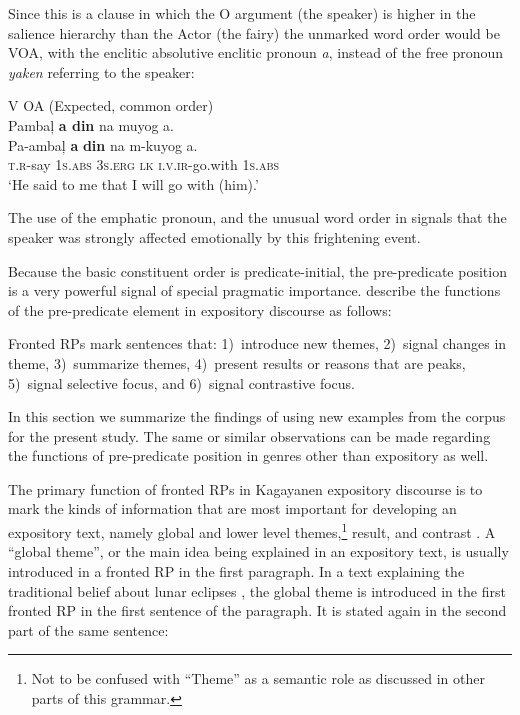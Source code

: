 \largerpage
Since this is a clause in which the O argument (the speaker) is higher in the salience hierarchy than the Actor (the fairy) the unmarked word order would be VOA, with the enclitic absolutive enclitic pronoun \textit{a}, instead of the free pronoun \textit{yaken} referring to the speaker:

\ea 
\hspace{.1cm}V\hspace{.7cm}   O\hspace{.2cm}A\hspace{.5cm} (Expected, common order) \\
Pambaļ  \textbf{a  din}  na  muyog  a.    \\\smallskip
\gll Pa-ambaļ  \textbf{a}  \textbf{din}  na  m-kuyog  a. \\
\textsc{t.r}-say  1\textsc{s.abs}  3\textsc{s.erg}  \textsc{lk}  \textsc{i.v.ir}-go.with  1\textsc{s.abs} \\
\glt ‘He said to me that I will go with (him).’
\z

The use of the emphatic pronoun, and the unusual word order in  signals that the speaker was strongly affected emotionally by this frightening event.

Because the basic constituent order is predicate-initial, the pre-predicate position is a very powerful signal of special pragmatic importance. \citet[89]{pebleyfunctions1999} describe the functions of the pre-predicate element in expository discourse as follows:

\begin{modquote}
Fronted RPs mark sentences that: 1)~introduce new themes, 2)~signal changes in theme, 3)~summarize themes, 4)~present results or reasons that are peaks, 5)~signal selective focus, and 6)~signal contrastive focus.
\end{modquote}

In this section we summarize the findings of \citet{pebleyfunctions1999} using new examples from the corpus for the present study. The same or similar observations can be made regarding the functions of pre-predicate position in genres other than expository as well.


The primary function of fronted RPs in Kagayanen expository discourse is to mark the kinds of information that are most important for developing an expository text, namely global and lower level themes,\footnote{Not to be confused with “Theme” as a semantic role as discussed in other parts of this grammar.} result, and contrast \citep{pebleyfunctions1999}. A “global theme”, or the main idea being explained in an expository text, is usually introduced in a fronted RP in the first paragraph. In a text explaining the traditional belief about lunar eclipses , the global theme is introduced in the first fronted RP in the first sentence of the paragraph. It is stated again in the second  part of the same sentence:


